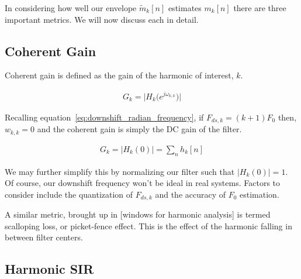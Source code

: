 \documentclass [11pt, proquest,oneside] {uwthesis}[2015/03/03]
\begin{document}
In considering how well our envelope $\tilde{m}_k[n]$ estimates $m_k[n]$ there are three important metrics.  We will now discuss each in detail.

\subsection{Coherent Gain}

Coherent gain is defined as the gain of the harmonic of interest, $k$.

\begin{align}
G_k = \Big| H_k\big(e^{j\omega_{k,k}}\big) \Big|
\end{align}

Recalling equation~\ref{eq:downshift_radian_frequency}, if $F_{ds,k} = (k+1)F_0$ then, $w_{k,k} = 0$ and the coherent gain is simply the DC gain of the filter.

\begin{align}
G_k = \Big| H_k(0) \Big| = \sum_n h_k[n]
\end{align}

We may further simplify this by normalizing our filter such that $\Big| H_k(0) \Big| = 1$.  Of course, our downshift frequency won't be ideal in real systems.  Factors to consider include the quantization of $F_{ds,k}$ and the accuracy of $F_0$ estimation.

A similar metric, brought up in [windows for harmonic analysis] is termed scalloping loss, or picket-fence effect.  This is the effect of the harmonic falling in between filter centers.  





\subsection{Harmonic SIR}
\end{document}
